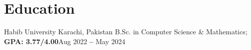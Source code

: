 \section{Education}
\vspace{3pt}
\resumeSubHeadingListStart

\resumeEducationHeading
{Habib University
}{Karachi, Pakistan}
{B.Sc. in Computer Science \& Mathematics;   \textbf{GPA: 3.77/4.00}}{Aug 2022 \textbf{--} May 2024}



\resumeSubHeadingListEnd
